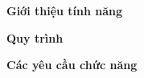 
\subsubsection{} %

\noindent \textbf{Giới thiệu tính năng}

\noindent \textbf{Quy trình} %

\noindent \textbf{Các yêu cầu chức năng}